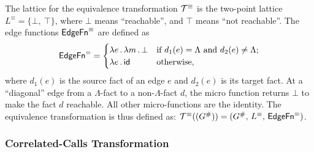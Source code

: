 The lattice
for the equivalence transformation $\mathcal T^\equiv$ 
is the two-point lattice
    $L^\equiv=\{\bot,\ \top\}$,
where $\bot$ means ``reachable'', and $\top$ means ``not reachable''. 
The edge functions $\textsf{EdgeFn}^\equiv$ are defined as
\begin{equation}
    \textsf{EdgeFn}^\equiv=
    \begin{cases}
      \lambda e\,.\,\lambda m\,.\,\bot&\text{if $d_1(e)=\Lambda$ and $d_2(e)\ne\Lambda$;}\\
      \lambda e\,.\,\textsf{id}&\text{otherwise,}
    \end{cases}
\end{equation}
where $d_1(e)$ is the source fact of an edge $e$ and $d_2(e)$ is its target fact. 
At a ``diagonal'' edge from a $\Lambda$-fact to a non-$\Lambda$-fact
$d$, the micro function returns $\bot$
to make
the fact $d$ reachable. All other micro-functions are the identity.
The equivalence transformation is thus defined as:
  $\mathcal T^\equiv((G^\#))=(G^\#,\,L^\equiv,\,\mathsf{EdgeFn}^\equiv)$.


\subsubsection{Correlated-Calls Transformation}\label{sec:cctrans}


